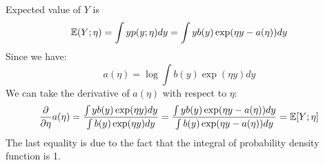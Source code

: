 \begin{answer}
    Expected value of $Y$ is
    $$
    \mathbb{E}(Y; \eta) = \int y p(y; \eta) dy = \int y b(y) \exp(\eta y - a(\eta)) dy
    $$
    Since we have:
    $$
    a(\eta) = \log \int b(y) \exp(\eta y) dy
    $$
    We can take the derivative of $a(\eta)$ with respect to $\eta$:
    $$
    \frac{\partial}{\partial \eta} a(\eta) = \frac{\int y b(y) \exp(\eta y) dy}{\int b(y) \exp(\eta y) dy} = \frac{\int y b(y) \exp(\eta y - a(\eta)) dy}{\int b(y) \exp(\eta y - a(\eta)) dy} = \mathbb{E}[Y; \eta]
    $$
    The last equality is due to the fact that the integral of probability density function is 1.
\end{answer}

